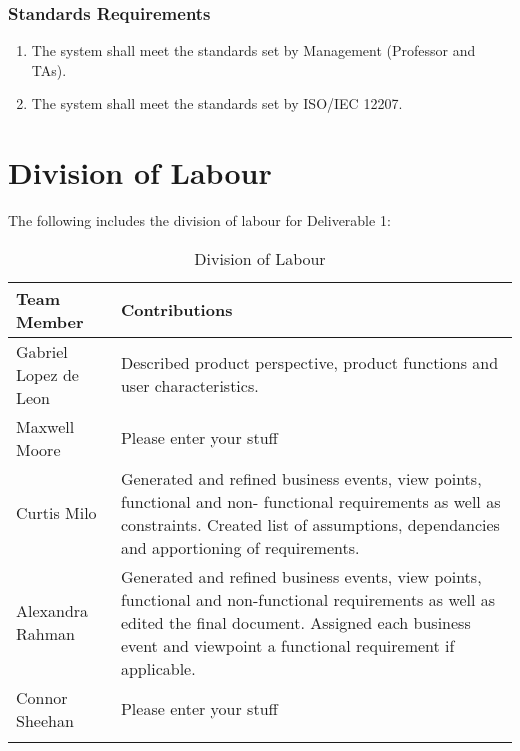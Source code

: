 \documentclass[titlepage]{article}
\begin{document}
		\subsubsection{Standards Requirements}
		\label{ssub:standards_requirements}
		\begin{enumerate}[{LR}1. ]
			\item
			The system shall meet the standards set by Management (Professor and TAs).
			\item
			The system shall meet the standards set by ISO/IEC 12207.
		\end{enumerate}
		
		
		
		\clearpage{}
		\appendix
		\section{Division of Labour}
		\label{sec:division_of_labour}
		The following includes the division of labour for Deliverable 1:
		
		\begin{longtable}{| p{} | p{} |}
			\hline
			\textbf {Team Member} & \textbf{Contributions}\\ 
			\hline
			Gabriel Lopez de Leon & Described product perspective, product functions and user characteristics.\\
			\hline
			Maxwell Moore & Please enter your stuff\\
			\hline
			Curtis Milo & Generated and refined business events, view points, functional and non- functional requirements as well as constraints. Created list of assumptions, dependancies and apportioning of requirements. \\ 
			\hline
			Alexandra Rahman & Generated and refined business events, view points, functional and non-functional requirements as well as edited the final document. Assigned each business event and viewpoint a functional requirement if applicable.\\
			\hline
			Connor Sheehan & Please enter your stuff\\
			\hline
			
			\caption{Division of Labour}
		\end{longtable}
		
		
		
		
		
		
		\iffalse
		\newpage
\end{document}
